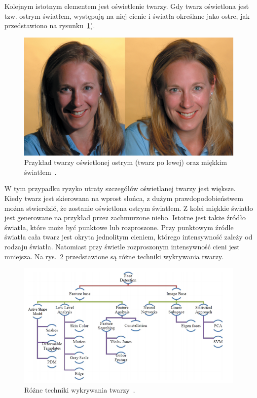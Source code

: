 \documentclass[a4paper,twoside,12pt]{book}
\begin{document}
    Kolejnym istotnym elementem jest oświetlenie twarzy.
    Gdy twarz oświetlona jest tzw. ostrym światłem, występują na
    niej cienie i światła określane jako ostre, jak przedstawiono na rysunku~\ref{fig.oswietlenieTwarzy}).
%
%
    \begin{figure}[h!]
        \centering
        \includegraphics[width=12cm]{Obrazy/oswietlenieTwarzy.jpg}
        \caption{Przykład twarzy oświetlonej ostrym (twarz po lewej) oraz miękkim światłem~\cite{oswietlenieTwarzy}.}
        \label{fig.oswietlenieTwarzy}
    \end{figure}
    W tym przypadku ryzyko utraty szczegółów oświetlanej twarzy jest większe.
    Kiedy twarz jest skierowana na wprost słońca, z dużym
    prawdopodobieństwem można stwierdzić, że zostanie oświetlona ostrym światłem.
    Z kolei miękkie światło jest generowane na przykład przez zachmurzone niebo.
    Istotne jest także źródło światła, które
    może być punktowe lub rozproszone.
    Przy punktowym źródle światła cała twarz jest
    okryta jednolitym cieniem, którego intensywność zależy od rodzaju światła.
    Natomiast przy świetle rozproszonym intensywność cieni jest mniejsza.
    Na rys.~\ref{fig.technikiWykrywaniaTwarzy} przedstawione są różne techniki wykrywania twarzy.
    \begin{figure}
        \centering
        \includegraphics[width=15cm]{Obrazy/technikiWykrywaniaTwarzy.jpg}
        \caption{Różne techniki wykrywania twarzy~\cite{faceDetectionTechniques}.}
        \label{fig.technikiWykrywaniaTwarzy}
    \end{figure}
\end{document}
